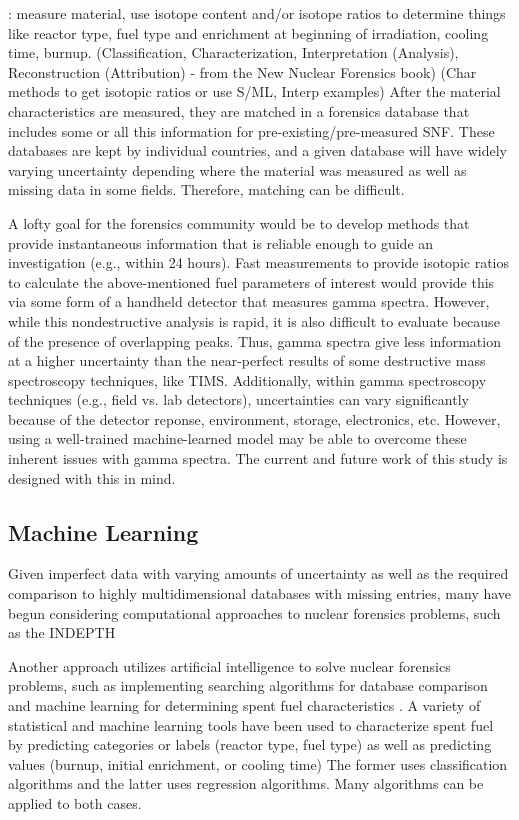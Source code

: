 \documentclass{anstrans}
\begin{document}
: measure material, use
isotope content and/or isotope ratios to determine things like reactor type,
fuel type and enrichment at beginning of irradiation, cooling time, burnup.
(Classification, Characterization, Interpretation (Analysis), Reconstruction
(Attribution) - from the New Nuclear Forensics book) (Char methods to get
isotopic ratios or use S/ML, Interp examples) After the material
characteristics are measured, they are matched in a forensics database that
includes some or all this information for pre-existing/pre-measured SNF. These
databases are kept by individual countries, and a given database will have
widely varying uncertainty depending where the material was measured as well as
missing data in some fields.  Therefore, matching can be difficult.

A lofty goal for the forensics community would be to develop methods that
provide instantaneous information that is reliable enough to guide an
investigation (e.g., within 24 hours). Fast measurements to provide isotopic
ratios to calculate the above-mentioned fuel parameters of interest would
provide this via some form of a handheld detector that measures gamma spectra.
However, while this nondestructive analysis is rapid, it is also difficult to
evaluate because of the presence of overlapping peaks.  Thus, gamma spectra
give less information at a higher uncertainty than the near-perfect results of
some destructive mass spectroscopy techniques, like TIMS.  Additionally, within gamma spectroscopy techniques (e.g., field
vs. lab detectors), uncertainties can vary significantly because of the
detector reponse, environment, storage, electronics, etc.  However, using a
well-trained machine-learned model may be able to overcome these inherent
issues with gamma spectra. The current and future work of this study is
designed with this in mind. 

\subsection{Machine Learning}

Given imperfect data with varying amounts of uncertainty as well as the
required comparison to highly multidimensional databases with missing entries,
many have begun considering computational approaches to nuclear forensics
problems, such as the INDEPTH

Another approach utilizes artificial intelligence to solve nuclear forensics
problems, such as implementing searching algorithms for database comparison and
machine learning for determining spent fuel characteristics .  A variety of statistical and machine
learning tools have been used to characterize spent fuel by predicting
categories or labels (reactor type, fuel type) as well as predicting values
(burnup, initial enrichment, or cooling time) The former uses classification
algorithms and the latter uses regression algorithms. Many algorithms can be
applied to both cases.
\end{document}
